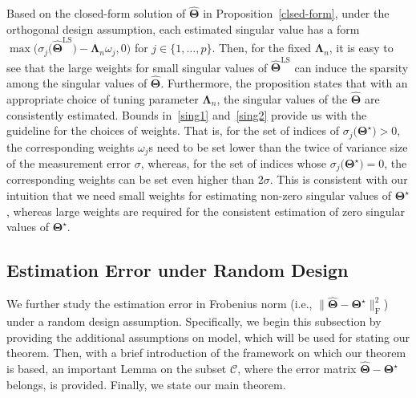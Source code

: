 \documentclass[12pt]{article}
\begin{document}
Based on the closed-form solution of $\widehat{\boldsymbol{\Theta}}$ in Proposition~\ref{clsed-form}, under the orthogonal design assumption, each estimated singular value has a form $\max \big(  \sigma_{j}\big(\widehat{\boldsymbol{\Theta}}^{\text{LS}}\big)-\boldsymbol{\Lambda}_{n} \omega_{j},0 \big)$ for $j\in\{1,\dots,p\}$.
Then, for the fixed $\boldsymbol{\Lambda}_{n}$, it is easy to see that the large weights for small singular values of $\widehat{\boldsymbol{\Theta}}^{\text{LS}}$ can induce the sparsity among the singular values of $\widehat{\boldsymbol{\Theta}}$.
Furthermore, the proposition states that with an appropriate choice of tuning parameter $\boldsymbol{\Lambda}_{n}$, the singular values of the $\widehat{\boldsymbol{\Theta}}$ are consistently estimated.
Bounds in~\eqref{sing1} and~\eqref{sing2} provide us with the guideline for the choices of weights.
That is, for the set of indices of $\sigma_{j}\big(\boldsymbol{\Theta}^{\star}\big)>0$, the corresponding weights $\omega_{j}$s need to be set lower than the twice of variance size of the measurement error $\sigma$, whereas, for the set of indices whose $\sigma_{j}\big(\boldsymbol{\Theta}^{\star}\big)=0$, the corresponding weights can be set even higher than $2\sigma$.
This is consistent with our intuition that we need small weights for estimating non-zero singular values of $\boldsymbol{\Theta}^{\star}$, whereas large weights are required for the consistent estimation of zero singular values of $\boldsymbol{\Theta}^{\star}$.


\subsection{Estimation Error under Random Design}
We further study the estimation error in Frobenius norm (i.e., $\| \widehat{\boldsymbol{\Theta}} - \boldsymbol{\Theta^{\star}} \|_{\text{F}}^{2}$)  under a random design assumption.
Specifically, we begin this subsection by providing the additional assumptions on model, which will be used for stating our theorem.
Then, with a brief introduction of the framework on which our theorem is based, an important Lemma on the subset $\mathcal{C}$, where the error matrix $\widehat{\boldsymbol{\Theta}}-\boldsymbol{\Theta^{\star}}$ belongs, is provided.
Finally, we state our main theorem.
\end{document}
